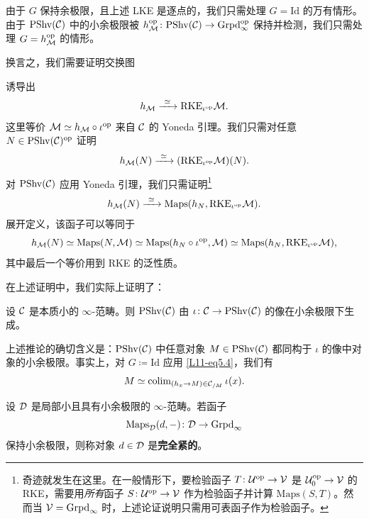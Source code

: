 由于 $G$ 保持余极限，且上述 LKE 是逐点的，我们只需处理 $G=\mathrm{Id}$ 的万有情形。由于 $\mathrm{PShv}(\mathcal{C})$ 中的小余极限被 $h^{\mathrm{op}}_{\mathcal{M}}\colon\mathrm{PShv}(\mathcal{C})\to\operatorname{Grpd}^{\mathrm{op}}_\infty$ 保持并检测，我们只需处理 $G=h^{\mathrm{op}}_{\mathcal{M}}$ 的情形。

换言之，我们需要证明交换图
\begin{center}
\end{center}
诱导出
\[
h_{\cM}\xrightarrow{\ \simeq\ }\mathrm{RKE}_{\iota^{\op}}\cM.
\]
这里等价 $\mathcal{M}\simeq h_{\mathcal{M}}\circ\iota^{\mathrm{op}}$ 来自 $\mathcal{C}$ 的 Yoneda 引理。我们只需对任意 $N\in\mathrm{PShv}(\mathcal{C})^{\mathrm{op}}$ 证明
\[
h_{\cM}(N)\xrightarrow{\ \simeq\ }(\mathrm{RKE}_{\iota^{\op}}\cM)(N).
\]
对 $\mathrm{PShv}(\mathcal{C})$ 应用 Yoneda 引理，我们只需证明\footnote{奇迹就发生在这里。在一般情形下，要检验函子 $T\colon\mathcal{U}^{\mathrm{op}}\to\mathcal{V}$ 是 $\mathcal{U}_0^{\mathrm{op}}\to\mathcal{V}$ 的 RKE，需要用\emph{所有}函子 $S\colon\mathcal{U}^{\mathrm{op}}\to\mathcal{V}$ 作为检验函子并计算 $\mathrm{Maps}(S,T)$。然而当 $\mathcal{V}=\operatorname{Grpd}_\infty$ 时，上述论证说明只需用可表函子作为检验函子。}
\[
h_{\cM}(N)\xrightarrow{\ \simeq\ }\mathrm{Maps}(h_N,\mathrm{RKE}_{\iota^{\op}}\cM).
\]
展开定义，该函子可以等同于
\[
h_{\mathcal{M}}(N)\simeq\mathrm{Maps}(N,\mathcal{M})\simeq\mathrm{Maps}(h_N\circ\iota^{\mathrm{op}},\mathcal{M})\simeq\mathrm{Maps}(h_N,\mathrm{RKE}_{\iota^{\mathrm{op}}}\mathcal{M}),
\]
其中最后一个等价用到 RKE 的泛性质。

\nitem\label{L11-5.3} 在上述证明中，我们实际上证明了：

\begin{corollary}\label{L11-5.4}
设 $\mathcal{C}$ 是本质小的 $\infty$-范畴。则 $\mathrm{PShv}(\mathcal{C})$ 由 $\iota\colon\mathcal{C}\to\mathrm{PShv}(\mathcal{C})$ 的像在小余极限下生成。
\end{corollary}

\begin{remark}\label{L11-5.5}
上述推论的确切含义是：$\mathrm{PShv}(\mathcal{C})$ 中任意对象 $M\in\mathrm{PShv}(\mathcal{C})$ 都同构于 $\iota$ 的像中对象的小余极限。事实上，对 $G\coloneqq\mathrm{Id}$ 应用 \eqref{L11-eq5.4}，我们有
\[
M\simeq\operatorname{colim}_{(h_x\to M)\in\mathcal{C}_{/M}}\iota(x).
\]
\end{remark}


\begin{definition}\label{L11-A.1}
设 $\mathcal{D}$ 是局部小且具有小余极限的 $\infty$-范畴。若函子
\[
\mathrm{Maps}_{\mathcal{D}}(d,-)\colon\mathcal{D}\to\operatorname{Grpd}_\infty
\]
保持小余极限，则称对象 $d\in\mathcal{D}$ 是\textbf{完全紧的}。
\end{definition}

